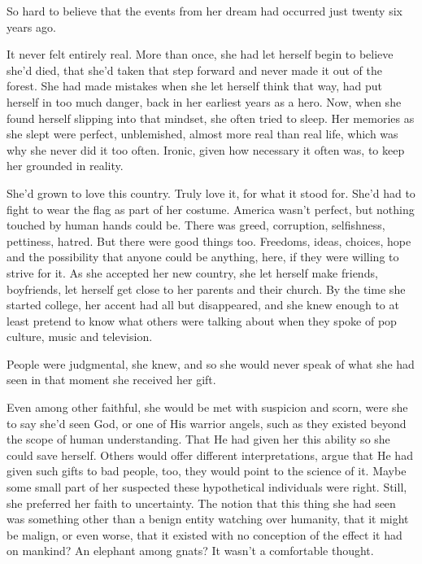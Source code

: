 So hard to believe that the events from her dream had occurred just twenty six years ago.



It never felt entirely real.  More than once, she had let herself begin to believe she'd died, that she'd taken that step forward and never made it out of the forest.  She had made mistakes when she let herself think that way, had put herself in too much danger, back in her earliest years as a hero.  Now, when she found herself slipping into that mindset, she often tried to sleep.  Her memories as she slept were perfect, unblemished, almost more real than real life, which was why she never did it too often.  Ironic, given how necessary it often was, to keep her grounded in reality.



She'd grown to love this country.  Truly love it, for what it stood for.  She'd had to fight to wear the flag as part of her costume.  America wasn't perfect, but nothing touched by human hands could be.  There was greed, corruption, selfishness, pettiness, hatred.  But there were good things too.  Freedoms, ideas, choices, hope and the possibility that anyone could be anything, here, if they were willing to strive for it.  As she accepted her new country, she let herself make friends, boyfriends, let herself get close to her parents and their church.  By the time she started college, her accent had all but disappeared, and she knew enough to at least pretend to know what others were talking about when they spoke of pop culture, music and television.



People were judgmental, she knew, and so she would never speak of what she had seen in that moment she received her gift.



Even among other faithful, she would be met with suspicion and scorn, were she to say she'd seen God, or one of His warrior angels, such as they existed beyond the scope of human understanding.  That He had given her this ability so she could save herself.  Others would offer different interpretations, argue that He had given such gifts to bad people, too, they would point to the science of it.  Maybe some small part of her suspected these hypothetical individuals were right.  Still, she preferred her faith to uncertainty.  The notion that this thing she had seen was something other than a benign entity watching over humanity, that it might be malign, or even worse, that it existed with no conception of the effect it had on mankind?  An elephant among gnats?  It wasn't a comfortable thought.



